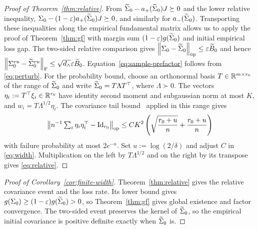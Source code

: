 \begin{proof}[Proof of Theorem~\ref{thm:relative}]
From $\widetilde\Sigma_0-a_+(\widetilde\Sigma_0)J\succeq0$ and the lower relative inequality,
$\Sigma_0-(1-\varepsilon)a_+(\widetilde\Sigma_0)J\succeq0$, and similarly for
$a_-(\widetilde\Sigma_0)$. Transporting these inequalities along the empirical
fundamental matrix allows us to apply the proof of Theorem~\ref{thm:gf} with margin
sum $(1-\varepsilon)g(\widetilde\Sigma_0)$ and initial empirical loss gap. The two-sided relative
comparison gives
$\left\lVert \Sigma_0-\widetilde\Sigma_0 \right\rVert_{\mathrm{op}}\le\varepsilon \widetilde B_0$ and hence
$\left\lVert \Sigma^{vu}_0-{\widetilde{\Sigma}}^{vu}_0 \right\rVert_{\mathrm{F}}\le\sqrt{d_\wedge}\varepsilon \widetilde B_0$.
Equation~\eqref{eq:sample-prefactor} follows from \eqref{eq:perturb}.
For the probability bound, choose an orthonormal basis
$T\in\mathbb{R}^{m\times r_0}$ of the range of $\widetilde\Sigma_0$ and write
$\widetilde\Sigma_0=T\Lambda T^\top$, where $\Lambda\succ0$.
The vectors $\eta_i:=T^\top\xi_i\in\mathbb{R}^{r_0}$ have identity second
moment and subgaussian norm at most $K$, and
$w_i=T\Lambda^{1/2}\eta_i$.
The covariance tail bound~\citep[Exercise 4.7.3]{Vershynin2018}
applied in this range gives
\[
 \left\lVert n^{-1}\textstyle\sum_i\eta_i\eta_i^\top-\mathrm{Id}_{r_0} \right\rVert_{\mathrm{op}}
 \le CK^2\left(\sqrt{\frac{r_0+u}{n}}+\frac{r_0+u}{n}\right)
\]
with failure probability at most $2e^{-u}$. Set $u:=\log(2/\delta)$ and
adjust $C$ in \eqref{eq:width}. Multiplication on the left by
$T\Lambda^{1/2}$ and on the right by its transpose gives
\eqref{eq:relative}.
\end{proof}
\begin{proof}[Proof of Corollary~\ref{cor:finite-width}]
Theorem~\ref{thm:relative} gives the relative covariance event and the
loss rate. Its lower bound gives
$g(\Sigma_0)\ge(1-\varepsilon)g(\widetilde\Sigma_0)>0$,
so Theorem~\ref{thm:gf} gives global existence and factor convergence.
The two-sided event preserves the kernel of $\widetilde\Sigma_0$, so the empirical
initial covariance is positive definite exactly when $\widetilde\Sigma_0$ is.
\end{proof}

